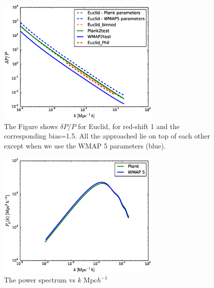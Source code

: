 \documentclass[10pt,a4paper]{article}
\begin{document}
\begin{figure}
\includegraphics[width=0.7\textwidth]{deltaP_ov_p_Euclid.eps}
\caption{The Figure shows $\delta P/P$  for Euclid, for red-shift 1 and the corresponding bias=1.5. All the approached lie on top of each other except when we use the WMAP 5 parameters (blue).}
\label{fig:cosmic_limit_Euclid_2}
\end{figure}

\begin{figure}
\includegraphics[width=0.7\textwidth]{pk.eps}
\caption{The power spectrum vs $k$ Mpc$h^{-1}$}
\label{fig:pk_vs_k}
\end{figure}
 
\end{document}
